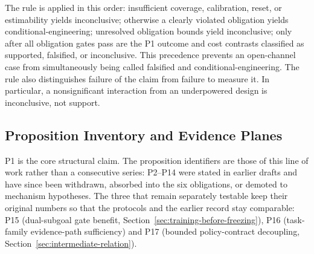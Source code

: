 \documentclass[11pt]{article}
\begin{document}
The rule is applied in this order: insufficient coverage, calibration, reset, or estimability yields inconclusive; otherwise a clearly violated obligation yields conditional-engineering; unresolved obligation bounds yield inconclusive; only after all obligation gates pass are the P1 outcome and cost contrasts classified as supported, falsified, or inconclusive. This precedence prevents an open-channel case from simultaneously being called falsified and conditional-engineering. The rule also distinguishes failure of the claim from failure to measure it. In particular, a nonsignificant interaction from an underpowered design is inconclusive, not support.

\subsection{Proposition Inventory and Evidence Planes}

P1 is the core structural claim. The proposition identifiers are those of this line of work rather than a consecutive series: P2--P14 were stated in earlier drafts and have since been withdrawn, absorbed into the six obligations, or demoted to mechanism hypotheses. The three that remain separately testable keep their original numbers so that the protocols and the earlier record stay comparable: P15 (dual-subgoal gate benefit, Section~\ref{sec:training-before-freezing}), P16 (task-family evidence-path sufficiency) and P17 (bounded policy-contract decoupling, Section~\ref{sec:intermediate-relation}).
\end{document}
